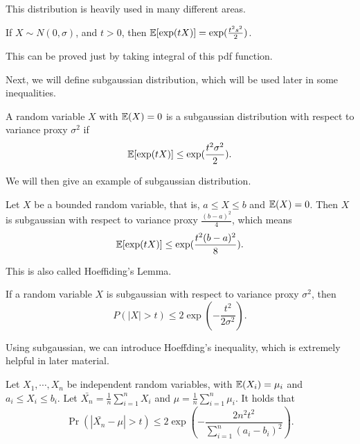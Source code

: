 \documentclass[../main.tex]{subfiles}
\begin{document}
This distribution is heavily used in many different areas.

\begin{fact}
	If $X \sim N(0, \sigma)$, and $t > 0$, then $\mathbb{E}[\exp(tX)] = \exp(\frac{t^2s^2}{2})$.
\end{fact}

This can be proved just by taking integral of this pdf function.

Next, we will define subgaussian distribution, which will be used later in some inequalities.

\begin{definition}
	A random variable $X$ with $\mathbb{E}(X) = 0$ is a subgaussian distribution with respect to variance proxy $\sigma^2$ if 
	\begin{equation}
		\mathbb{E}[\exp(tX)] \leq \exp(\frac{t^2\sigma^2}{2}).
	\end{equation}
\end{definition}

We will then give an example of subgaussian distribution.

\begin{example}
	Let $X$ be a bounded random variable, that is, $a \leq X \leq b$ and $\mathbb{E}(X) = 0$. Then $X$ is subgaussian with respect to variance proxy $\frac{(b-a)^2}{4}$, which means
	\begin{equation*}
		\mathbb{E}[\exp(tX)] \leq \exp(\frac{t^2(b-a)^2}{8}).
	\end{equation*}
\end{example}

This is also called Hoeffiding's Lemma.

\begin{claim}
	If a random variable $X$ is subgaussian with respect to variance proxy $\sigma^2$, then 
	\begin{equation}
	 	P(|X|> t) \leq 2\exp(-\frac{t^2}{2\sigma^2}). 
	\end{equation}
\end{claim}

Using subgaussian, we can introduce Hoeffding's inequality, which is extremely helpful in later material.

\begin{theorem}
	Let $X_1, \cdots ,X_n$ be independent random variables, with $\mathbb{E}(X_i) = \mu_i$ and $a_i \leq X_i \leq b_i$. Let $\bar{X_n} = \frac{1}{n} \sum\limits_{i=1}^n X_i$ and $\mu  = \frac{1}{n}  \sum\limits_{i=1}^n \mu_i$. It holds that 
	\begin{equation}
		\Pr(|\bar{X_n} - \mu| > t) \leq 2 \exp(-\frac{2n^2t^2}{\sum\limits_{i=1}^n (a_i - b_i)^2}).
	\end{equation}
\end{theorem}
\end{document}
